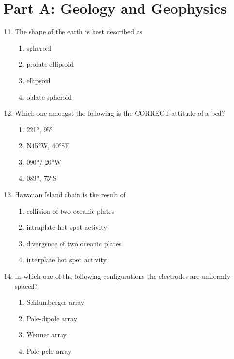 \documentclass[journal,12pt,onecolumn]{IEEEtran}
\theoremstyle{remark}
\begin{document}
\section*{Part A: Geology and Geophysics }
\vspace{0.5cm}

\begin{enumerate}
\setcounter{enumi}{10}

\item The shape of the earth is best described as  
\begin{multicols}{2}
\begin{enumerate}
\item spheroid  
\item prolate ellipsoid  
\item ellipsoid  
\item oblate spheroid  
\end{enumerate}
\end{multicols}

\item Which one amongst the following is the CORRECT attitude of a bed?  
\begin{multicols}{4}
\begin{enumerate}
\item 221°, 95°  
\item N45°W, 40°SE  
\item 090°/ 20°W  
\item 089°, 75°S  
\end{enumerate}
\end{multicols}

\item Hawaiian Island chain is the result of  
\begin{enumerate}
\item collision of two oceanic plates  
\item intraplate hot spot activity  
\item divergence of two oceanic plates  
\item interplate hot spot activity  
\end{enumerate}

\item In which one of the following configurations the electrodes are uniformly spaced?  
\begin{enumerate}
\item Schlumberger array  
\item Pole-dipole array  
\item Wenner array  
\item Pole-pole array  
\end{enumerate}


\end{enumerate}
\end{document}
